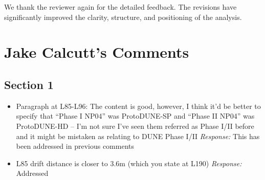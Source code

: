 \documentclass[11pt]{article}
\begin{document}
\vspace{0.3cm}

\noindent

We thank the reviewer again for the detailed feedback. The revisions have significantly improved the clarity, structure, and positioning of the analysis.


\section*{Jake Calcutt's Comments}

\subsection*{Section 1}
\begin{itemize}
    \item Paragraph at L85-L96: The content is good, however, I think it’d be better to specify that “Phase I NP04” was ProtoDUNE-SP and “Phase II NP04” was ProtoDUNE-HD – I’m not sure I’ve seen them referred as Phase I/II before and it might be mistaken as relating to DUNE Phase I/II
      \textit{Response:} This has been addressed in previous comments
      
    \item L85 drift distance is closer to 3.6m (which you state at L190)
     \textit{Response:} Addressed
\end{itemize}
\end{document}
